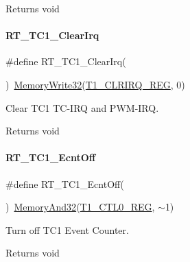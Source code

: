 \begin{DoxyReturn}{Returns}
void 
\end{DoxyReturn}
\mbox{\label{a00044_ab9c21242bf3ba2144aa45a336a4dc7ea}} 
\paragraph{\texorpdfstring{R\+T\+\_\+\+T\+C1\+\_\+\+Clear\+Irq}{RT\_TC1\_ClearIrq}}
{\footnotesize\ttfamily \#define R\+T\+\_\+\+T\+C1\+\_\+\+Clear\+Irq(\begin{DoxyParamCaption}{ }\end{DoxyParamCaption})~\mbox{\hyperlink{a00020_a6b9732365b12e48ddb89fe1028b975b0}{Memory\+Write32}}(\mbox{\hyperlink{a00020_a282b05d93f0e94b950d13c1f567dc36d}{T1\+\_\+\+C\+L\+R\+I\+R\+Q\+\_\+\+R\+EG}}, 0)}



Clear T\+C1 T\+C-\/\+I\+RQ and P\+W\+M-\/\+I\+RQ. 

\begin{DoxyReturn}{Returns}
void 
\end{DoxyReturn}
\mbox{\label{a00044_a1c9b9839a03d3e9b1158a2be2feebf42}} 
\paragraph{\texorpdfstring{R\+T\+\_\+\+T\+C1\+\_\+\+Ecnt\+Off}{RT\_TC1\_EcntOff}}
{\footnotesize\ttfamily \#define R\+T\+\_\+\+T\+C1\+\_\+\+Ecnt\+Off(\begin{DoxyParamCaption}{ }\end{DoxyParamCaption})~\mbox{\hyperlink{a00020_ad87cedffcaadc51db22594fce55173d4}{Memory\+And32}}(\mbox{\hyperlink{a00020_a55600694c3c73a1019f78d306f474fa1}{T1\+\_\+\+C\+T\+L0\+\_\+\+R\+EG}}, $\sim$1)}



Turn off T\+C1 Event Counter. 

\begin{DoxyReturn}{Returns}
void 
\end{DoxyReturn}
\mbox{\label{a00044_add9b6f778a744d79226f5165a04a38d9}} 
